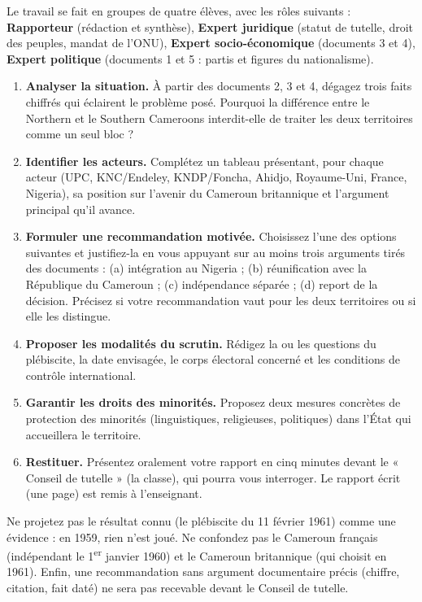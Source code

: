 \documentclass[11pt]{article}
\newcounter{popsec}
\newcounter{popsub}
\newcommand{\courssub}[1]{%
  \stepcounter{popsub}%
  \par\vspace{9pt}\noindent{\popxbold\fontsize{11.5}{13}\selectfont\color{popink}{\color{poporange}\thepopsec.\thepopsub}\hspace{6pt}#1}\par\nopagebreak\vspace{4pt}
}
\begin{document}
\courssub{Consignes}

Le travail se fait en groupes de quatre élèves, avec les rôles suivants : \textbf{Rapporteur} (rédaction et synthèse), \textbf{Expert juridique} (statut de tutelle, droit des peuples, mandat de l'ONU), \textbf{Expert socio-économique} (documents 3 et 4), \textbf{Expert politique} (documents 1 et 5 : partis et figures du nationalisme).

\begin{enumerate}
\item \textbf{Analyser la situation.} À partir des documents 2, 3 et 4, dégagez trois faits chiffrés qui éclairent le problème posé. Pourquoi la différence entre le Northern et le Southern Cameroons interdit-elle de traiter les deux territoires comme un seul bloc ?
\item \textbf{Identifier les acteurs.} Complétez un tableau présentant, pour chaque acteur (UPC, KNC/Endeley, KNDP/Foncha, Ahidjo, Royaume-Uni, France, Nigeria), sa position sur l'avenir du Cameroun britannique et l'argument principal qu'il avance.
\item \textbf{Formuler une recommandation motivée.} Choisissez l'une des options suivantes et justifiez-la en vous appuyant sur au moins trois arguments tirés des documents : (a) intégration au Nigeria ; (b) réunification avec la République du Cameroun ; (c) indépendance séparée ; (d) report de la décision. Précisez si votre recommandation vaut pour les deux territoires ou si elle les distingue.
\item \textbf{Proposer les modalités du scrutin.} Rédigez la ou les questions du plébiscite, la date envisagée, le corps électoral concerné et les conditions de contrôle international.
\item \textbf{Garantir les droits des minorités.} Proposez deux mesures concrètes de protection des minorités (linguistiques, religieuses, politiques) dans l'État qui accueillera le territoire.
\item \textbf{Restituer.} Présentez oralement votre rapport en cinq minutes devant le « Conseil de tutelle » (la classe), qui pourra vous interroger. Le rapport écrit (une page) est remis à l'enseignant.
\end{enumerate}

\begin{attention}
Ne projetez pas le résultat connu (le plébiscite du 11 février 1961) comme une évidence : en 1959, rien n'est joué. Ne confondez pas le Cameroun français (indépendant le 1\textsuperscript{er} janvier 1960) et le Cameroun britannique (qui choisit en 1961). Enfin, une recommandation sans argument documentaire précis (chiffre, citation, fait daté) ne sera pas recevable devant le Conseil de tutelle.
\end{attention}
\end{document}
